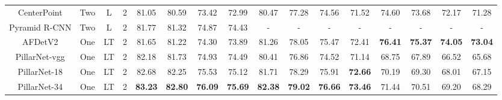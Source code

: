 \documentclass[runningheads]{llncs}
\begin{document}
\begin{table}[thb]
{\begin{tabular}{c|c|c|c|cc|cc|cc|cc|cc|cc}
CenterPoint \cite{yin2021center} & Two & L & 2 & 81.05 & 80.59 & 73.42 & 72.99 & 80.47 & 77.28 & 74.56 & 71.52 & 74.60 & 73.68 & 72.17 & 71.28 \\
Pyramid R-CNN \cite{mao2021pyramid} & Two & L & 2 & 81.77 & 81.32 & 74.87 & 74.43 & - & - & - & - & - & - & - & - \\
AFDetV2 \cite{Hu2021AFDetV2RT} & One & LT & 2 & 81.65 & 81.22 & 74.30 & 73.89 & 81.26 & 78.05 & 75.47 & 72.41 & \textbf{76.41} & \textbf{75.37} & \textbf{74.05} & \textbf{73.04} \\
PillarNet-vgg & One &LT & 2 & 82.18 & 81.73 & 74.93 & 74.49 & 80.41 & 76.86 & 74.52 & 71.14 & 68.75 & 67.89 & 66.52 & 65.68 \\
PillarNet-18 & One &LT & 2 & 82.68 & 82.25 & 75.53 & 75.12 & 81.71 & 78.29 & 75.91 & \textbf{72.66} & 70.19 & 69.30 & 68.01 & 67.15 \\
PillarNet-34 & One & LT & 2 & \textbf{83.23} & \textbf{82.80} & \textbf{76.09} & \textbf{75.69} & \textbf{82.38} & \textbf{79.02} & \textbf{76.66} & \textbf{73.46} & 71.44 & 70.51 & 69.20 & 68.29  \\
\hline       
\end{tabular}
}
\end{table}
\end{document}
